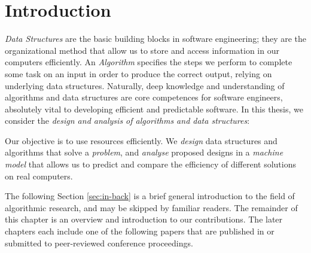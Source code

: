 \chapter{Introduction}
\emph{Data Structures} are the basic building blocks in software engineering; they are the organizational method that allow us to store and access information in our computers efficiently. 
An \emph{Algorithm} specifies the steps we perform to complete some task on an input in order to produce the correct output, relying on underlying data structures. %
Naturally, deep knowledge and understanding of algorithms and data structures are core competences for software engineers, absolutely vital to developing efficient and predictable software. In this thesis, we consider the \emph{design and analysis of algorithms and data structures}:


\begin{leftbar}
\noindent Our objective is to use resources efficiently. We \emph{design} data structures and algorithms that solve a \emph{problem}, and \emph{analyse} proposed designs in a \emph{machine model} that allows us to predict and compare the efficiency of different solutions on real computers.
\end{leftbar}



The following Section \ref{sec:in-back} is a brief general introduction to the field of algorithmic research, and may be skipped by familiar readers. The remainder of this chapter is an overview and introduction to our contributions.
The later chapters each include one of the following papers that are published in or submitted to peer-reviewed conference proceedings. 

